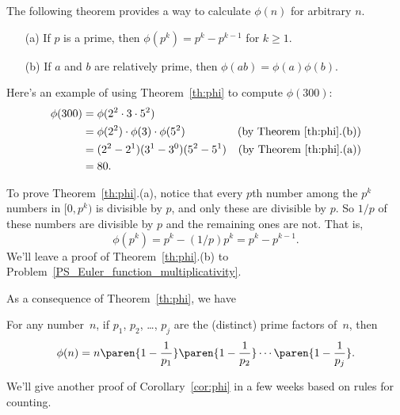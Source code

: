 The following theorem provides a way to calculate $\phi(n)$ for arbitrary $n$.
\begin{theorem}\label{th:phi}\mbox{}
\begin{enumerate}
\item[(a)] If $p$ is a prime, then $\phi(p^k) = p^k - p^{k-1}$ for $k \geq 1$.
\item[(b)] If $a$ and $b$ are relatively prime, then $\phi(ab) = \phi(a)\phi(b)$.
\end{enumerate}
\end{theorem}

Here's an example of using Theorem~\ref{th:phi} to compute $\phi(300)$:
\begin{align*}
\phi(300) & = \phi(2^2 \cdot 3 \cdot 5^2)\\
& = \phi(2^2) \cdot \phi(3) \cdot \phi(5^2) &
\text{(by Theorem~\ref{th:phi}.(b))}\\
& = (2^2 - 2^1) (3^1 - 3^0) (5^2 - 5^1) & \text{(by
  Theorem~\ref{th:phi}.(a))}\\
& = 80.
\end{align*}

To prove Theorem~\ref{th:phi}.(a), notice that every $p$th number among the $p^k$ numbers
in $[0, p^{k})$ is divisible by $p$, and only these are divisible by $p$.  So $1/p$ of
  these numbers are divisible by $p$ and the remaining ones are not.  That is,
\[
\phi(p^{k}) = p^k - (1/p)p^k = p^k -p^{k-1}.
\]
We'll leave a proof of Theorem~\ref{th:phi}.(b) to
Problem~\ref{PS_Euler_function_multiplicativity}.

As a consequence of Theorem~\ref{th:phi}, we have
\begin{corollary}\label{cor:phi}
For any number~$n$, if $p_1$, $p_2$, \dots, $p_j$ are the (distinct) prime factors of~$n$,
then
\begin{equation*}
    \phi(n) = n \paren{1 - \frac{1}{p_1}} \paren{1 - \frac{1}{p_2}} \cdots \paren{1 -
      \frac{1}{p_j}}.
 \end{equation*}
\end{corollary}
We'll give another proof of Corollary~\ref{cor:phi} in a few weeks based on rules for
counting.

\iffalse are all those of the form $mp$.  For $mp$ to be in the interval, $m$ can take any
value from 0 to $p^{k-1}-1$ and no others, so there are exactly $p^{k-1}$ numbers in the
interval that are divisible by $p$.  Now $\phi(p^{k})$ equals the number of remaining
elements in the interval, namely, $p^k -p^{k-1}$.  \fi

